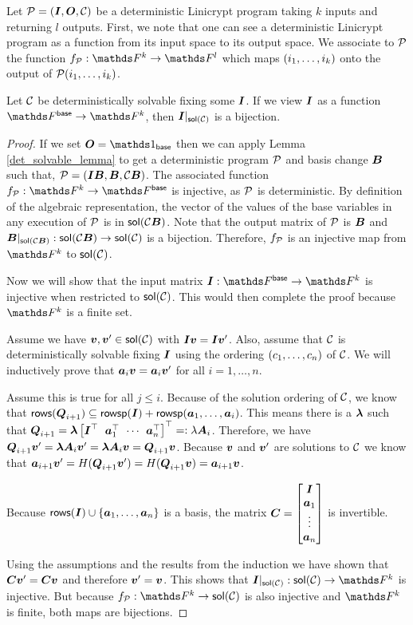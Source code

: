 Let $\P = (\I, \O, \C)$ be a deterministic Linicrypt program taking $k$ inputs and returning $l$ outputs.
First, we note that one can see a deterministic Linicrypt program as a function from its input space to its output space.
We associate to $\P$ the function $f_\P: \F^k \to \F^l$ which maps $(\dts i k)$ onto the output of $\P(\dts i k)$.

\begin{lemma}
\label{lemma:solution_space_bijection}
    Let $\C$ be deterministically solvable fixing some $\I$.
    If we view $\I$ as a function $\Fsp \to \F^k$,
    then $\I|_{\sol(\C)}$ is a bijection.
\end{lemma}

\begin{proof}
    If we set $\O = \Id_\base$
    then we can apply Lemma \ref{det_solvable_lemma} to get a deterministic program $\P$ and basis change $\B$ such that,
    $\P = (\I\B, \B, \C\B)$. 
    The associated function $f_{\P}: \F^k \to \F^\base$ is injective,
    as $\P$ is deterministic.
    By definition of the algebraic representation, 
    the vector of the values of the base variables in any execution of $\P$ is in $\sol(\C\B)$.
    Note that the output matrix of $\P$ is $\B$ 
    and $\B|_{\sol(\C\B)}: \sol(\C\B) \to \sol(\C)$ is a bijection.
    Therefore, $f_\P$ is an injective map from $\F^k$ to $\sol(\C)$.

    Now we will show that the input matrix $\I: \Fsp \to \F^k$ is injective
    when restricted to $\sol(\C)$.
    This would then complete the proof because $\F^k$ is a finite set.
    
    Assume we have $\vv, \vv' \in \sol(\C)$ with $\I\vv = \I\vv'$.
    Also, assume that $\C$ is deterministically solvable fixing $\I$
    using the ordering $(\dts c n)$ of $\C$.
    We will inductively prove that $\va_i \vv = \va_i \vv'$ for all $i = 1, \dots, n$.

    Assume this is true for all $ j \leq i$.
    Because of the solution ordering of $\C$, we know that
    $\rows(\Q_{i+1}) \subseteq \rowsp(\I) + \rowsp(\dts \va {i})$. 
    This means there is a $\v \lambda$ such that $\Q_{i+1} = \v \lambda \m{\I^\top & \va_1^\top & \cdots & \va_n^\top}^\top =: \lambda \v A_i$.
    Therefore, we have $\Q_{i+1} \vv' = \vl \v A_i \vv' = \vl \v A_i \vv = \Q_{i+1} \vv$.
    Because $\vv$ and $\vv'$ are solutions to $\C$ we know that
    $\va_{i+1}\vv' = \H(\Q_{i+1}\vv') = \H(\Q_{i+1}\vv) = \va_{i+1}\vv$.

    Because $\rows(\I) \cup \{\va_1, \dots, \va_n\}$ is a basis, 
    the matrix 
    $
    \v C = \m{\I \\ \vdts \va n}
    $
    is invertible.

    Using the assumptions and the results from the induction we have shown that $\v C \vv' = \v C \vv$ and
    therefore $\vv' = \vv$.
    This shows that $\I|_{\sol(\C)}: \sol(\C) \to \F^k$ is injective.
    But because $f_\P: \F^k \to \sol(\C)$ is also injective
    and $\F^k$ is finite,
    both maps are bijections.
\end{proof}

